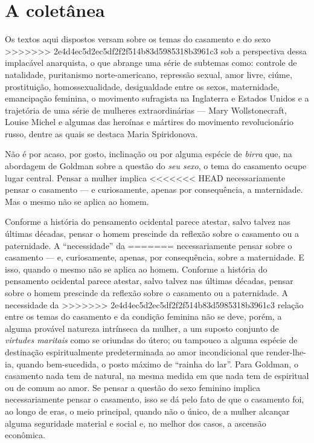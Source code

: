 \section{A coletânea}

Os textos aqui dispostos versam sobre os temas do casamento e do sexo
>>>>>>> 2e4d4ec5d2ec5df2f2f514b83d5985318b3961c3
sob a perspectiva dessa implacável anarquista, o que abrange uma série
de subtemas como: controle de natalidade, puritanismo
norte-americano, repressão sexual, amor livre, ciúme,
prostituição, homossexualidade, desigualdade entre os sexos,
maternidade, emancipação feminina, o movimento sufragista na
Inglaterra e Estados Unidos e a trajetória de uma série de mulheres
extraordinárias --- Mary Wollstonecraft, Louise Michel e algumas das
heroínas e mártires do movimento revolucionário russo, dentre as quais
se destaca Maria Spiridonova.

Não é por acaso, por gosto, inclinação ou por alguma espécie de
\textit{birra} que, na abordagem de Goldman sobre a questão do \textit{seu sexo},
o tema do casamento ocupe lugar central. Pensar a mulher implica
<<<<<<< HEAD
necessariamente pensar o casamento --- e curiosamente, apenas por
consequência, a maternidade.
Mas o mesmo não se aplica ao homem.

Conforme a história do pensamento ocidental parece atestar,
salvo talvez nas últimas décadas, pensar o homem prescinde da
reflexão sobre o casamento ou a paternidade. A ``necessidade'' da
=======
necessariamente pensar sobre o casamento --- e, curiosamente, apenas, por
consequência, sobre a maternidade. E isso, quando o mesmo não se aplica
ao homem. Conforme a história do pensamento ocidental parece atestar,
salvo talvez nas últimas décadas, pensar sobre o homem prescinde da
reflexão sobre o casamento ou a paternidade. A necessidade da
>>>>>>> 2e4d4ec5d2ec5df2f2f514b83d5985318b3961c3
relação entre os temas do casamento e da condição feminina não se deve,
porém, a alguma provável natureza intrínseca da mulher, a um suposto
conjunto de \textit{virtudes maritais} como se oriundas do útero; ou tampouco
a alguma espécie de destinação espiritualmente predeterminada ao amor
incondicional que render-lhe-ia, quando bem-sucedida, o posto máximo de
``rainha do lar''. Para Goldman, o casamento nada tem de natural, na
mesma medida em que nada tem de espiritual ou de comum ao amor. Se
pensar a questão do sexo feminino implica necessariamente pensar o
casamento, isso se dá pelo fato de que o casamento foi, ao longo de
eras, o meio principal, quando não o único, de a mulher alcançar alguma
seguridade material e social e, no melhor dos casos, a
ascensão econômica.

